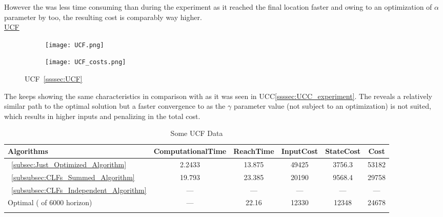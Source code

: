 However the  was less time consuming than  during the experiment as it reached the final location faster and owing to an optimization of \(\alpha\) parameter by  too, the resulting cost is comparably way higher. \\


\underline{UCF}
\label{ssssec:UCF_experiments} %


\begin{figure}[htbp]
  \begin{subfigure}{0.6\textwidth}
    \centering
    \texttt{[image: UCF.png]}
  \label{fig:UCF_CostEvol}
  \end{subfigure}
  \begin{subfigure}{0.59\textwidth}
    \centering
    \texttt{[image: UCF\_costs.png]}
  \label{fig:UCF_trajectory}
  \end{subfigure}
  \caption{UCF~\ref{ssssec:UCF}}
\label{fig:UCFTrajectory_and_CostEvol}
\end{figure}



The  keeps showing the same characteristics in comparison with  as it was seen in UCC\ref{ssssec:UCC_experiment}. The  reveals a relatively similar path to the optimal solution but a faster convergence to \txtref as the \(\gamma\) parameter value (not subject to an optimization) is not suited, which results in higher inputs and penalizing in the total cost. 



  \bgroup
 \begin{xltabular}{\textwidth}{|l|ccccc|}
   \toprule
   Algorithms   & ComputationalTime  & ReachTime  & InputCost   & StateCost & Cost           \\
   \midrule
    ~\ref{subsec:Just_Optimized_Algorithm}           & 2.2433 & 13.875  & 49425 & 3756.3 & 53182 \\
    ~\ref{subsubsec:CLFs_Summed_Algorithm}        & 19.793  & 23.385     & 20190 & 9568.4 & 29758 \\
    ~\ref{subsubsec:CLFs_Independent_Algorithm}   & ---   & ---      & ---  & ---  & ---  \\
    Optimal ( of 6000 horizon)                        & ---    & 22.16 & 12330  & 12348 & 24678 \\
    \midrule
    \caption{Some UCF Data}
   \label{tab:Some_UCF_Data}\\
   \end{xltabular}
 \egroup

